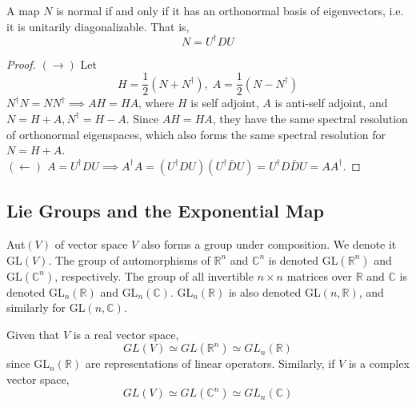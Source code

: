   \begin{theorem}
    A map $N$ is normal if and only if it has an orthonormal basis of eigenvectors, i.e. it is unitarily diagonalizable. That is, 
    \begin{equation}
      N = U^\dagger D U 
    \end{equation}
  \end{theorem}
  \begin{proof}
    $(\rightarrow)$ Let 
    \begin{equation}
      H = \frac{1}{2} (N + N^\dagger), \; A = \frac{1}{2} (N - N^\dagger)
    \end{equation}
    $N^\dagger N = N N^\dagger \implies A H = H A$, where $H$ is self adjoint, $A$ is anti-self adjoint, and $N = H + A, N^\dagger = H - A$. Since $A H = H A$, they have the same spectral resolution of orthonormal eigenspaces, which also forms the same spectral resolution for $N = H + A$. \\
    $(\leftarrow)$ $A = U^\dagger D U \implies A^\dagger A = (U^\dagger D U) (U^\dagger \bar{D} U) = U^\dagger D \bar{D} U = A A^\dagger$. 
  \end{proof}

\subsection{Lie Groups and the Exponential Map}

  \begin{definition}
    Aut$(V)$ of vector space $V$ also forms a group under composition. We denote it GL$(V)$. The group of automorphisms of $\mathbb{R}^n$ and $\mathbb{C}^n$ is denoted GL$(\mathbb{R}^n)$ and GL$(\mathbb{C}^n)$, respectively. The group of all invertible $n \times n$ matrices over $\mathbb{R}$ and $\mathbb{C}$ is denoted GL$_n(\mathbb{R})$ and GL$_n(\mathbb{C})$. GL$_n(\mathbb{R})$ is also denoted GL$(n, \mathbb{R})$, and similarly for GL$(n, \mathbb{C})$. 
  \end{definition}

  \begin{proposition}
    Given that $V$ is a real vector space, 
    \begin{equation}
      GL(V) \simeq GL(\mathbb{R}^n) \simeq GL_n (\mathbb{R})
    \end{equation}
    since GL$_n(\mathbb{R})$ are representations of linear operators. Similarly, if $V$ is a complex vector space, 
    \begin{equation}
      GL(V) \simeq GL(\mathbb{C}^n) \simeq GL_n (\mathbb{C})
    \end{equation}
  \end{proposition}

